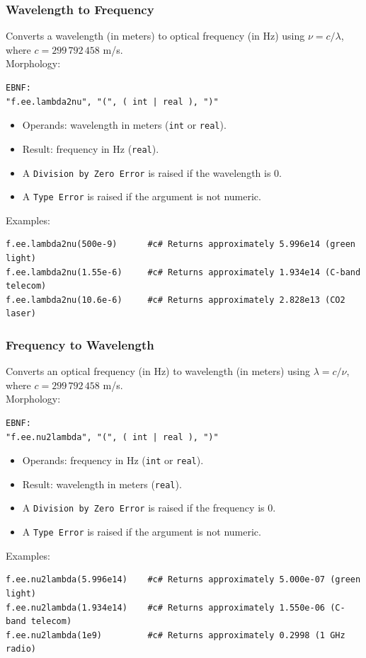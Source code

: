 \subsubsection{Wavelength to Frequency}
Converts a wavelength (in meters) to optical frequency (in Hz) using $\nu = c / \lambda$, where $c = 299\,792\,458$ m/s. \\
Morphology:
\begin{verbatim}
EBNF:
"f.ee.lambda2nu", "(", ( int | real ), ")"
\end{verbatim}
\begin{itemize}
\item Operands: wavelength in meters (\texttt{int} or \texttt{real}).
\item Result: frequency in Hz (\texttt{real}).
\item A \texttt{Division by Zero Error} is raised if the wavelength is $0$.
\item A \texttt{Type Error} is raised if the argument is not numeric.
\end{itemize}
Examples:
\begin{verbatim}
f.ee.lambda2nu(500e-9)      #c# Returns approximately 5.996e14 (green light)
f.ee.lambda2nu(1.55e-6)     #c# Returns approximately 1.934e14 (C-band telecom)
f.ee.lambda2nu(10.6e-6)     #c# Returns approximately 2.828e13 (CO2 laser)
\end{verbatim}

\subsubsection{Frequency to Wavelength}
Converts an optical frequency (in Hz) to wavelength (in meters) using $\lambda = c / \nu$, where $c = 299\,792\,458$ m/s. \\
Morphology:
\begin{verbatim}
EBNF:
"f.ee.nu2lambda", "(", ( int | real ), ")"
\end{verbatim}
\begin{itemize}
\item Operands: frequency in Hz (\texttt{int} or \texttt{real}).
\item Result: wavelength in meters (\texttt{real}).
\item A \texttt{Division by Zero Error} is raised if the frequency is $0$.
\item A \texttt{Type Error} is raised if the argument is not numeric.
\end{itemize}
Examples:
\begin{verbatim}
f.ee.nu2lambda(5.996e14)    #c# Returns approximately 5.000e-07 (green light)
f.ee.nu2lambda(1.934e14)    #c# Returns approximately 1.550e-06 (C-band telecom)
f.ee.nu2lambda(1e9)         #c# Returns approximately 0.2998 (1 GHz radio)
\end{verbatim}

